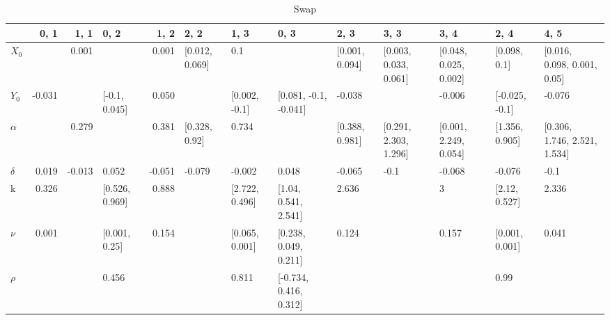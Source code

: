 \begin{table}[H]
\begin{adjustbox}{width=\textwidth}
  \end{adjustbox}

\end{table}

\begin{table}[H]
	\centering
	\caption{Swap}
	\label{swap_table}
	
	\begin{adjustbox}{width=\textwidth}
		
\begin{tabular}{lrrlrllllllll}
	\toprule
	{} &   0, 1 &   1, 1 &            0, 2 &   1, 2 &            2, 2 &            1, 3 &                    0, 3 &            2, 3 &                   3, 3 &                   3, 4 &            2, 4 &                          4, 5 \\
	\midrule
	$X_0$   &        &  0.001 &                 &  0.001 &  [0.012, 0.069] &             0.1 &                         &  [0.001, 0.094] &  [0.003, 0.033, 0.061] &  [0.048, 0.025, 0.002] &    [0.098, 0.1] &   [0.016, 0.098, 0.001, 0.05] \\
	$Y_0$   & -0.031 &        &   [-0.1, 0.045] &  0.050 &                 &   [0.002, -0.1] &   [0.081, -0.1, -0.041] &          -0.038 &                        &                 -0.006 &  [-0.025, -0.1] &                        -0.076 \\
	$\alpha$ &        &  0.279 &                 &  0.381 &   [0.328, 0.92] &           0.734 &                         &  [0.388, 0.981] &  [0.291, 2.303, 1.296] &  [0.001, 2.249, 0.054] &  [1.356, 0.905] &  [0.306, 1.746, 2.521, 1.534] \\
	$\delta$ &  0.019 & -0.013 &           0.052 & -0.051 &          -0.079 &          -0.002 &                   0.048 &          -0.065 &                   -0.1 &                 -0.068 &          -0.076 &                          -0.1 \\
	k     &  0.326 &        &  [0.526, 0.969] &  0.888 &                 &  [2.722, 0.496] &    [1.04, 0.541, 2.541] &           2.636 &                        &                      3 &   [2.12, 0.527] &                         2.336 \\
	$\nu$    &  0.001 &        &   [0.001, 0.25] &  0.154 &                 &  [0.065, 0.001] &   [0.238, 0.049, 0.211] &           0.124 &                        &                  0.157 &  [0.001, 0.001] &                         0.041 \\
	$\rho$   &        &        &           0.456 &        &                 &           0.811 &  [-0.734, 0.416, 0.312] &                 &                        &                        &            0.99 &                               \\

\end{tabular}
\end{adjustbox}
\end{table}
